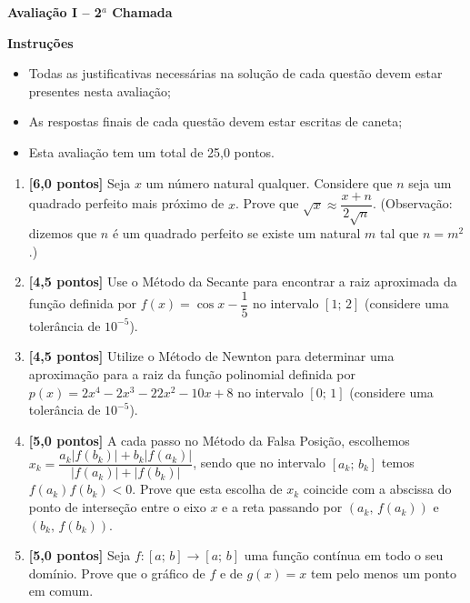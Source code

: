 \documentclass[12pt,a4paper]{article}
\begin{document}
\begin{center}
 \textbf{Avaliação I -- 2$^a$ Chamada}
\end{center}

\textbf{Instruções}
\begin{itemize}
 \item Todas as justificativas necessárias na solução de cada questão devem estar presentes nesta avaliação;
 \item As respostas finais de cada questão devem estar escritas de caneta;
 \item Esta avaliação tem um total de 25,0 pontos.
\end{itemize}

\begin{enumerate}
 \item \textbf{[6,0 pontos]} Seja $x$ um número natural qualquer. Considere que $n$ seja um quadrado perfeito mais próximo de $x$. Prove que $\sqrt{x}\approx \dfrac{x+n}{2\sqrt{n}}$. 
 (Observação: dizemos que $n$ é um quadrado perfeito se existe um natural $m$ tal que $n = m^2$.)
 \item \textbf{[4,5 pontos]} Use o Método da Secante para encontrar a raiz aproximada da função definida por $f(x) = \cos x - \dfrac{1}{5}$ no intervalo $[1;\,2]$ (considere uma tolerância de $10^{-5}$).
 \item \textbf{[4,5 pontos]} Utilize o Método de Newnton para determinar uma aproximação para a raiz da função polinomial definida por $p(x) = 2x^4 -2x^3 -22x^2 - 10x + 8$ no intervalo $[0;\,1]$ (considere uma tolerância 
 de $10^{-5}$).
 \item \textbf{[5,0 pontos]} A cada passo no Método da Falsa Posição, escolhemos $x_k = \dfrac{a_k|f(b_k)| + b_k|f(a_k)|}{|f(a_k)|+|f(b_k)|}$, sendo que no intervalo $[a_k;\,b_k]$ temos $f(a_k)f(b_k)<0$. Prove que 
 esta escolha de $x_k$ coincide com a abscissa do ponto de interseção entre o eixo $x$ e a reta passando por $(a_k,\,f(a_k))$ e $(b_k,\,f(b_k))$.

 \item \textbf{[5,0 pontos]} Seja $f:[a;\, b]\to [a;\,b]$ uma função contínua em todo o seu domínio. Prove que o gráfico de $f$ e de $g(x) = x$ tem pelo 
menos um ponto em comum.

\end{enumerate}
\end{document}
